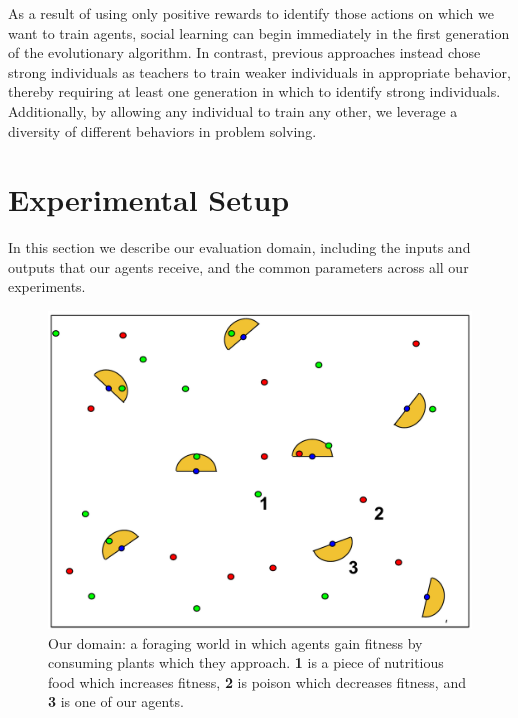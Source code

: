 \documentclass{acm_proc_article-sp}
\begin{document}
As a result of using only positive rewards to identify those actions on which we want to train agents, social learning can begin immediately in the first generation of the evolutionary algorithm. In contrast, previous approaches \cite{denaro1996cultural} instead chose strong individuals as teachers to train weaker individuals in appropriate behavior, thereby requiring at least one generation in which to identify strong individuals. Additionally, by allowing any individual to train any other, we leverage a diversity of different behaviors in problem solving.

\section{Experimental Setup}
\label{sec:setup}
In this section we describe our evaluation domain, including the inputs and outputs that our agents receive, and the common parameters across all our experiments.


\begin{figure}[t]
  \centering
    \includegraphics[scale=.3]{world.pdf}
  \caption{Our domain: a foraging world in which agents gain fitness by consuming plants which they approach.  \textbf{1} is a piece of nutritious food which increases fitness, \textbf{2} is poison which decreases fitness, and \textbf{3} is one of our agents.}
  \label{fig:foraging-world}
\end{figure}
\end{document}
